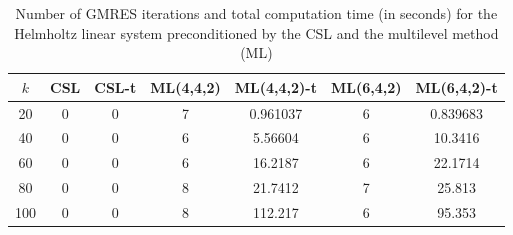 \begin{table}[t]
\centering
\begin{tabular}{ccccccc}
\hline
$k$ & CSL & CSL-t & ML(4,4,2) & ML(4,4,2)-t& ML(6,4,2) & ML(6,4,2)-t \\ \hline
20 & 0 & 0 & 7 & 0.961037 & 6 & 0.839683 \\
40 & 0 & 0 & 6 & 5.56604 & 6 & 10.3416 \\
60 & 0 & 0 & 6 & 16.2187 & 6 & 22.1714 \\
80 & 0 & 0 & 8 & 21.7412 & 7 & 25.813 \\
100 & 0 & 0 & 8 & 112.217 & 6 & 95.353 \\
\hline
\end{tabular}
\caption{Number of GMRES iterations and total computation time (in seconds) for the Helmholtz linear system preconditioned by the  CSL and the multilevel method (ML)}
\label{table:mlgmres_csl_vs_adef_coarse_eps_10}
\end{table}
